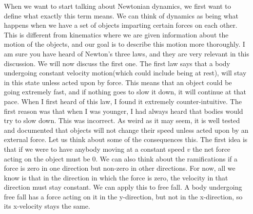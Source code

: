 \newline
When we want to start talking about Newtonian dynamics, we first want to define what exactly this term means. We can think of dynamics as being what happens when we have a set of objects imparting certain forces on each other. This is different from kinematics where we are given information about the motion of the objects, and our goal is to describe this motion more thoroughly. I am sure you have heard of Newton’s three laws, and they are very relevant in this discussion. We will now discuss the first one. The first law says that a body undergoing constant velocity motion(which could include being at rest), will stay in this state unless acted upon by force. This means that an object could be going extremely fast, and if nothing goes to slow it down, it will continue at that pace. When I first heard of this law, I found it extremely counter-intuitive. The first reason was that when I was younger, I had always heard that bodies would try to slow down. This was incorrect. As weird as it may seem, it is well tested and documented that objects will not change their speed unless acted upon by an external force. Let us think about some of the consequences this. The first idea is that if we were to have anybody moving at a constant speed $v$ the net force acting on the object must be 0. We can also think about the ramifications if a force is zero in one direction but non-zero in other directions. For now, all we know is that in the direction in which the force is zero, the velocity in that direction must stay constant. We can apply this to free fall. A body undergoing free fall has a force acting on it in the y-direction, but not in the x-direction, so its x-velocity stays the same. 

